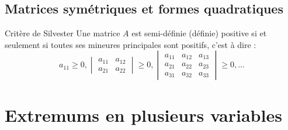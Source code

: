 \section{Matrices symétriques et formes quadratiques}
\begin{bclogo}[couleur=green!30,couleurBord=green,logo=\bccle ,ombre=true,arrondi=0.1]{Critère de Silvester}
Une matrice $A$ est semi-définie (définie) positive si et seulement si toutes ses mineures principales sont positifs, c'est à  dire :
$$a_{11}\ge 0, \begin{vmatrix} a_{11}&a_{12}\\ a_{21} & a_{22}\end{vmatrix}\ge 0,\begin{vmatrix}a_{11} & a_{12} & a_{13}\\ a_{21} & a_{22} & a_{23}\\ a_{31} & a_{32} & a_{33}\end{vmatrix}\ge 0, ...$$
\end{bclogo}
\chapter{Extremums en plusieurs variables}